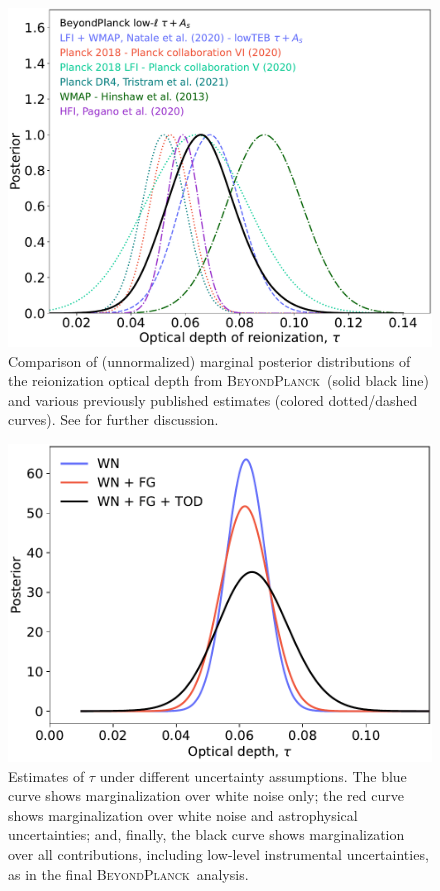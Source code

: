 \documentclass[twocolumn]{aa}
\newcommand{\BP}{\textsc{BeyondPlanck}}
\begin{document}
\begin{figure}[t]
  \center
  \includegraphics[width=\linewidth]{figs/BP10_tau_post+LFI2020.pdf}
  \caption{Comparison of (unnormalized) marginal
    posterior distributions of the reionization optical depth from
    \BP\ (solid black line) and various previously published estimates
    (colored dotted/dashed curves). See \citet{bp12} for further discussion.}\label{fig:tau}
\end{figure}


\begin{figure}[t]
	\center
	\includegraphics[width=\linewidth]{figs/BP10_tau_syst_assess.pdf}
        \caption{Estimates of $\tau$ under different uncertainty
          assumptions. The blue curve shows marginalization over white
          noise only; the red 
          curve shows marginalization over white noise and
          astrophysical uncertainties; and, finally, the black curve
          shows marginalization over all contributions, including
          low-level instrumental uncertainties, as in the
          final \BP\ analysis.}
	\label{fig:tau_assess}
\end{figure}
\end{document}
